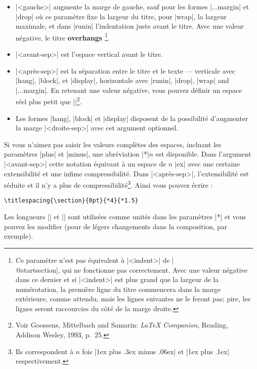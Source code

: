 \documentclass[a4paper]{ltxguide}
\newcommand{\trad}[1]{\textbf{\textcolor{orange5}{\noindent\ding{54} #1 \ding{54}}}}
\def\gobble#1{}
\def\cs#1{\expandafter\gobble\string\\#1}
\begin{document}
\begin{itemize}
\item |<gauche>| augmente la marge de gauche, sauf pour les formes |...margin| 
et |drop| où ce paramètre fixe la largeur du titre, pour |wrap|, la largeur 
maximale, et dans |runin| l'indentation juste avant le titre. Avec une 
valeur négative, le titre \trad{overhangs} \footnote{Ce paramètre n'est pas 
équivalent à |<indent>| de |\cs{@startsection}|, qui ne fonctionne pas 
correctement. Avec une valeur négative dans ce dernier et si |<indent>| est
plus grand que la largeur de la numérotation, la première ligne du titre 
commencera dans la marge extérieure, comme attendu, mais les lignes suivantes 
ne le feront pas; pire, les lignes seront raccourcies du côté de la marge 
droite.}.

\item |<avant-sep>| est l'espace vertical avant le titre.

\item |<après-sep>| est la séparation entre le titre et le texte --- verticale 
avec |hang|, |block|, et |display|, horizontale avec |runin|, |drop|, |wrap| 
and |...margin|. En retenant une valeur négative, vous pouvez définir un
espace réel plus petit que |\parskip|\footnote{Voir 
Goossens, Mittelbach and Samarin: \textit{\LaTeX{} Companion}, 
Reading, Addison Wesley, 1993, p.~25.}.

\item Les formes |hang|, |block| et |display| disposent de la possibilité 
d'augmenter la marge |<droite-sep>| avec cet argument optionnel.
\end{itemize}

Si vous n'aimez pas saisir les valeurs complètes des espaces, incluant les
paramètres |plus| et |minus|, une abréviation |*|$n$ est disponible. Dans 
l'argument |<avant-sep>| cette notation équivaut à un espace de $n$ |ex| 
avec une certaine extensibilité et une infime compressibilité. Dans  
|<après-sep>|, l'extensibilité est réduite et il n'y a plus de 
compressibilité\footnote{Ils correspondent à $n$ fois |1ex plus .3ex minus 
.06ex| et |1ex plus .1ex| respectivement.}. Ainsi vous pouvez écrire :
\begin{verbatim}
\titlespacing{\section}{0pt}{*4}{*1.5}
\end{verbatim}
Les longueurs |\beforetitleunit| et |\aftertitleunit| sont utilisées 
comme unités dans les paramètres |*| et vous pouvez les modifier (pour de 
légers changements dans la composition, par exemple).
\end{document}
